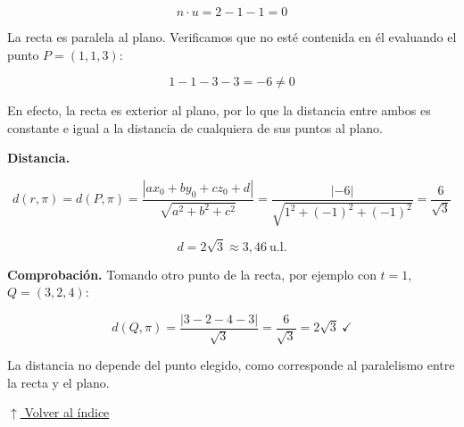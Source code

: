 \documentclass[12pt]{article}
\newcommand{\volverindice}{%
    \vspace{1em}%
    \begin{flushright}%
        \hyperlink{indice}{\small $\uparrow$ Volver al índice}%
    \end{flushright}%
}
\begin{document}
\[
n\cdot u=2-1-1=0
\]

La recta es paralela al plano. Verificamos que no esté contenida en él
evaluando el punto $P=(1,1,3)$:

\[
1-1-3-3=-6\neq0
\]

En efecto, la recta es exterior al plano, por lo que la distancia entre
ambos es constante e igual a la distancia de cualquiera de sus puntos al
plano.

\textbf{Distancia.}

\[
d(r,\pi)=d(P,\pi)=\frac{|a x_0+b y_0+c z_0+d|}{\sqrt{a^2+b^2+c^2}}
=\frac{|-6|}{\sqrt{1^2+(-1)^2+(-1)^2}}=\frac{6}{\sqrt{3}}
\]

\[
\boxed{d=2\sqrt{3}\approx3{,}46\ \text{u.l.}}
\]

\textbf{Comprobación.} Tomando otro punto de la recta, por ejemplo con
$t=1$, $Q=(3,2,4)$:

\[
d(Q,\pi)=\frac{|3-2-4-3|}{\sqrt{3}}=\frac{6}{\sqrt{3}}=2\sqrt{3}\ \checkmark
\]

La distancia no depende del punto elegido, como corresponde al paralelismo
entre la recta y el plano.

\volverindice
\newpage
\end{document}
